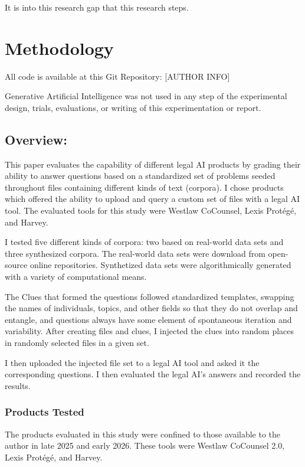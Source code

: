 \documentclass[
]{article}
\begin{document}
It is into this research gap that this research steps.

\section{Methodology}\label{methodology}

All code is available at this Git Repository: {[}AUTHOR INFO{]}

Generative Artificial Intelligence was not used in any step of the experimental design, trials, evaluations, or writing of this experimentation or report.

\subsection{Overview:}\label{overview}

This paper evaluates the capability of different legal AI products by grading their ability to answer questions based on a standardized set of problems seeded throughout files containing different kinds of text (corpora). I chose products which offered the ability to upload and query a custom set of files with a legal AI tool. The evaluated tools for this study were Westlaw CoCounsel, Lexis Protégé, and Harvey.

I tested five different kinds of corpora: two based on real-world data sets and three synthesized corpora. The real-world data sets were download from open-source online repositories. Synthetized data sets were algorithmically generated with a variety of computational means.

The Clues that formed the questions followed standardized templates, swapping the names of individuals, topics, and other fields so that they do not overlap and entangle, and questions always have some element of spontaneous iteration and variability. After creating files and clues, I injected the clues into random places in randomly selected files in a given set.

I then uploaded the injected file set to a legal AI tool and asked it the corresponding questions. I then evaluated the legal AI's answers and recorded the results.

\subsubsection{Products Tested}\label{products-tested}

The products evaluated in this study were confined to those available to the author in late 2025 and early 2026. These tools were Westlaw CoCounsel 2.0, Lexis Protégé, and Harvey.
\end{document}
